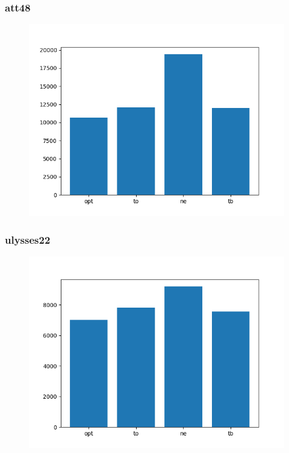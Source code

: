 \documentclass[11pt]{article}
\begin{document}
        \subsubsection{att48}
            \begin{center}
            \begin{figure}[H]

                \includegraphics[scale=0.6]{att48.png}

            \end{figure}
            \end{center}

        \subsubsection{ulysses22}
            \begin{center}
            \begin{figure}[H]

                \includegraphics[scale=0.6]{ulysses22.png}

            \end{figure}
            \end{center}
\end{document}
